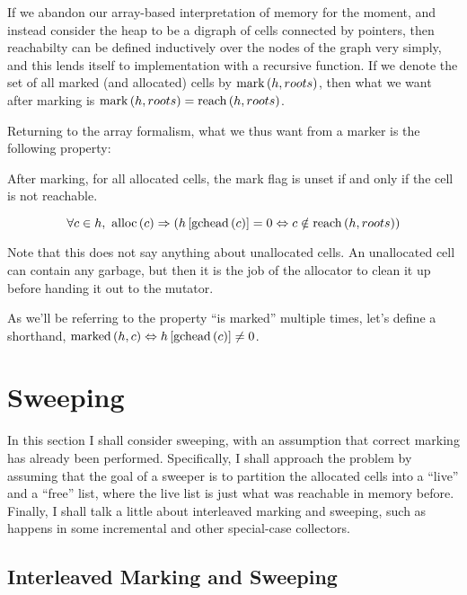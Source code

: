 If we abandon our array-based interpretation of memory for the moment,
and instead consider the \gls{heap} to be a digraph of \glspl{cell}
connected by \glspl{pointer}, then reachabilty can be defined
inductively over the nodes of the graph very simply, and this lends
itself to implementation with a recursive function. If we denote the
set of all marked (and allocated) cells by $\mathrm{mark}\left(h, roots\right)$, then
what we want after marking is $\mathrm{mark}\left(h, roots\right) = \mathrm{reach}\left(h, roots\right)$.

Returning to the array formalism, what we thus want from a marker is
the following property:

\begin{definition}
  After marking, for all allocated \glspl{cell}, the mark flag is
  unset if and only if the \gls{cell} is not reachable.

  \[\forall c \in h,\ \mathrm{alloc}\left(c\right) \Rightarrow
  \left(h\left[\mathrm{gchead}\left(c\right)\right] = 0 \Leftrightarrow c \notin
    \mathrm{reach}\left(h, roots\right)\right)\]
\end{definition}

Note that this does not say anything about unallocated
\glspl{cell}. An unallocated \gls{cell} can contain any garbage, but
then it is the job of the allocator to clean it up before handing it
out to the \gls{mutator}.

As we'll be referring to the property ``is marked'' multiple times,
let's define a shorthand, $\mathrm{marked}\left(h, c\right) \Leftrightarrow h\left[\mathrm{gchead}\left(c\right)\right]
\neq 0$.

\section{Sweeping}


In this section I shall consider sweeping, with an assumption that
correct marking has already been performed. Specifically, I shall
approach the problem by assuming that the goal of a sweeper is to
partition the allocated cells into a ``live'' and a ``free'' list,
where the live list is just what was reachable in memory
before. Finally, I shall talk a little about interleaved marking and
sweeping, such as happens in some incremental and other special-case
collectors.


\subsection{Interleaved Marking and Sweeping}

